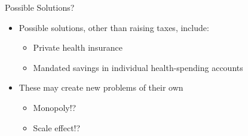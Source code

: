 \documentclass[aspectratio=1610]{beamer}
\begin{document}

\begin{frame}[wide]{Possible Solutions?}
	\begin{itemize}
		\item Possible solutions, other than raising taxes, include:
		\vspace{3mm}
		\begin{itemize}
			\item Private health insurance 
			\item Mandated savings in individual health-spending accounts
		\end{itemize}
		\vspace{6mm}
		\item These may create new problems of their own
		\vspace{3mm}
		\begin{itemize}
			\item Monopoly!?
			\item Scale effect!?
		\end{itemize}
	\end{itemize}
\end{frame}
\end{document}
